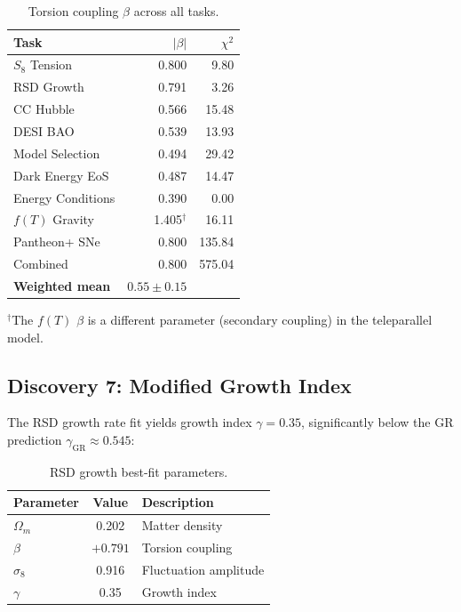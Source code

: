 \documentclass[twocolumn,prd,superscriptaddress,nofootinbib]{revtex4-2}
\begin{document}
\begin{table}[h]
\caption{Torsion coupling $\beta$ across all tasks.}
\label{tab:beta}
\begin{ruledtabular}
\begin{tabular}{lrr}
Task & $|\beta|$ & $\chi^2$ \\
\hline
$S_8$ Tension & 0.800 & 9.80 \\
RSD Growth & 0.791 & 3.26 \\
CC Hubble & 0.566 & 15.48 \\
DESI BAO & 0.539 & 13.93 \\
Model Selection & 0.494 & 29.42 \\
Dark Energy EoS & 0.487 & 14.47 \\
Energy Conditions & 0.390 & 0.00 \\
$f(T)$ Gravity & 1.405$^\dagger$ & 16.11 \\
Pantheon+ SNe & 0.800 & 135.84 \\
Combined & 0.800 & 575.04 \\
\hline
\textbf{Weighted mean} & $\mathbf{0.55 \pm 0.15}$ & \\
\end{tabular}
\end{ruledtabular}
{\footnotesize $^\dagger$The $f(T)$ $\beta$ is a different parameter (secondary coupling) in the teleparallel model.}
\end{table}

\subsection{Discovery 7: Modified Growth Index}

The RSD growth rate fit yields growth index $\gamma = 0.35$, significantly below the GR prediction $\gamma_\text{GR} \approx 0.545$:

\begin{table}[h]
\caption{RSD growth best-fit parameters.}
\label{tab:rsd_params}
\begin{ruledtabular}
\begin{tabular}{lcl}
Parameter & Value & Description \\
\hline
$\Omega_m$ & 0.202 & Matter density \\
$\beta$ & $+0.791$ & Torsion coupling \\
$\sigma_8$ & 0.916 & Fluctuation amplitude \\
$\gamma$ & 0.35 & Growth index \\
\end{tabular}
\end{ruledtabular}
\end{table}
\end{document}
